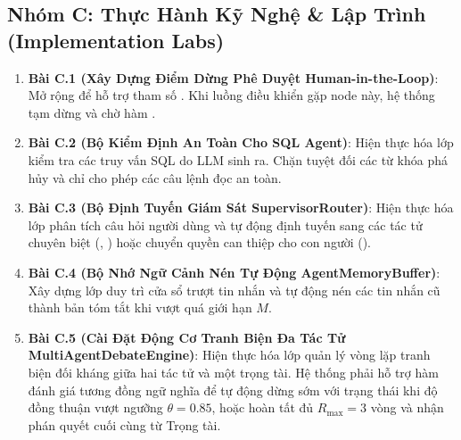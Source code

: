 \subsection{Nhóm C: Thực Hành Kỹ Nghệ \& Lập Trình (Implementation Labs)}
\begin{enumerate}
  \item \textbf{Bài C.1 (Xây Dựng Điểm Dừng Phê Duyệt Human-in-the-Loop)}:
  Mở rộng  để hỗ trợ tham số . Khi luồng điều khiển gặp node này, hệ thống tạm dừng và chờ hàm .

  \item \textbf{Bài C.2 (Bộ Kiểm Định An Toàn Cho SQL Agent)}:
  Hiện thực hóa lớp  kiểm tra các truy vấn SQL do LLM sinh ra. Chặn tuyệt đối các từ khóa phá hủy và chỉ cho phép các câu lệnh đọc  an toàn.

  \item \textbf{Bài C.3 (Bộ Định Tuyến Giám Sát SupervisorRouter)}:
  Hiện thực hóa lớp  phân tích câu hỏi người dùng và tự động định tuyến sang các tác tử chuyên biệt (, ) hoặc chuyển quyền can thiệp cho con người ().

  \item \textbf{Bài C.4 (Bộ Nhớ Ngữ Cảnh Nén Tự Động AgentMemoryBuffer)}:
  Xây dựng lớp  duy trì cửa sổ trượt tin nhắn và tự động nén các tin nhắn cũ thành bản tóm tắt khi vượt quá giới hạn $M$.

  \item \textbf{Bài C.5 (Cài Đặt Động Cơ Tranh Biện Đa Tác Tử MultiAgentDebateEngine)}:
  Hiện thực hóa lớp  quản lý vòng lặp tranh biện đối kháng giữa hai tác tử và một trọng tài. Hệ thống phải hỗ trợ hàm đánh giá tương đồng ngữ nghĩa  để tự động dừng sớm với trạng thái  khi độ đồng thuận vượt ngưỡng $\theta = 0.85$, hoặc hoàn tất đủ $R_{\max} = 3$ vòng và nhận phán quyết cuối cùng từ Trọng tài.
\end{enumerate}

